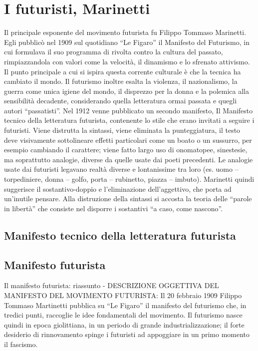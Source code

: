 \documentclass[10pt]{report}
\begin{document}
		\section[Marinetti]{I futuristi, Marinetti}
		Il principale esponente del movimento futurista fu Filippo Tommaso Marinetti. Egli pubblicò nel 1909 sul quotidiano “Le Figaro” il Manifesto del Futurismo, in cui formulava il suo programma di rivolta contro la cultura del passato, rimpiazzandola con valori come la velocità, il dinamismo e lo sfrenato attivismo. Il punto principale a cui si ispira questa corrente culturale è che la tecnica ha cambiato il mondo. Il futurismo inoltre esalta la violenza, il nazionalismo, la guerra come unica igiene del mondo, il disprezzo per la donna e la polemica alla sensibilità decadente, considerando quella letteratura ormai passata e quegli autori “passatisti”.
		Nel 1912 venne pubblicato un secondo manifesto, Il Manifesto tecnico della letteratura futurista, contenente lo stile che erano invitati a seguire i futuristi. Viene distrutta la sintassi, viene eliminata la punteggiatura, il testo deve visivamente sottolineare effetti particolari come un boato o un sussurro, per esempio cambiando il carattere; viene fatto largo uso di onomatopee, sinestesie, ma soprattutto analogie, diverse da quelle usate dai poeti precedenti. Le analogie usate dai futuristi legavano realtà diverse e lontanissime tra loro (es. uomo – torpediniere, donna – golfo, porta – rubinetto, piazza – imbuto). Marinetti quindi suggerisce il sostantivo-doppio e l’eliminazione dell’aggettivo, che porta ad un’inutile pensare. Alla distruzione della sintassi si accosta la teoria delle “parole in libertà” che consiste nel disporre i sostantivi “a caso, come nascono”.
		
		\subsection[Manifesto Tecnico]{Manifesto tecnico della letteratura futurista}
		
		\subsection[Manifesto Futurista]{Manifesto futurista}
		Il manifesto futurista: riassunto - DESCRIZIONE OGGETTIVA DEL MANIFESTO DEL MOVIMENTO FUTURISTA: Il 20 febbraio 1909 Filippo Tommaso Martinetti pubblica su “Le Figaro” il manifesto del futurismo che, in tredici punti, raccoglie le idee fondamentali del movimento. Il futurismo nasce quindi in epoca giolittiana, in un periodo di grande industrializzazione; il forte desiderio di rinnovamento spinge i futuristi ad appoggiare in un primo momento il fascismo. 
		
\end{document}
